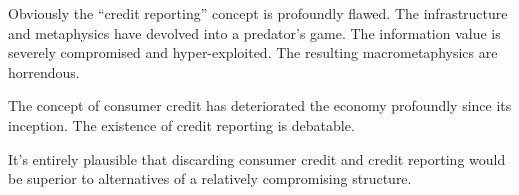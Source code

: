 

﻿Obviously the ``credit reporting'' concept is profoundly flawed.  The
infrastructure and metaphysics \break have devolved into a predator's
game.  The information value is severely compromised and
hyper-exploited.  The resulting macrometaphysics are horrendous.

The concept of consumer credit has deteriorated the economy profoundly
since its inception.  The existence of credit reporting is debatable.

It's entirely plausible that discarding consumer \break credit and
credit reporting would be superior to alternatives of a relatively
compromising structure.

\bye
